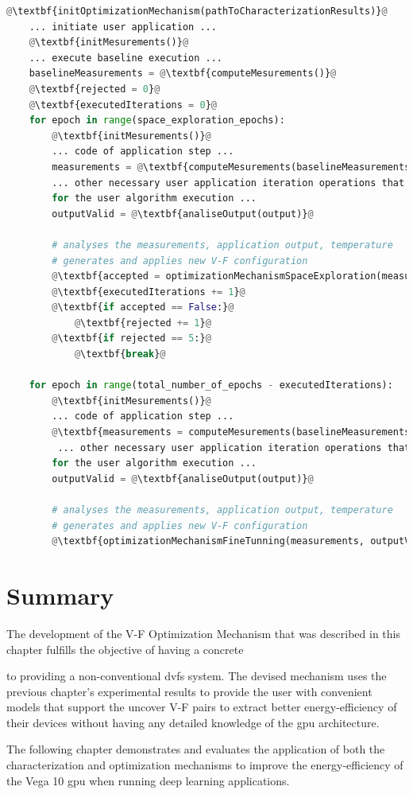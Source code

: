 \begin{lstlisting}[language=Python, caption=Example of usage of V-F Optimization Mechanism Library. Bold statements represents the added programming elements for the mechanism, label=lst:wrapper, basicstyle=\footnotesize\ttfamily,abovecaptionskip=0pt, captionpos=b,escapechar=@]
    @\textbf{initOptimizationMechanism(pathToCharacterizationResults)}@
    ... initiate user application ...
    @\textbf{initMesurements()}@
    ... execute baseline execution ...
    baselineMeasurements = @\textbf{computeMesurements()}@
    @\textbf{rejected = 0}@
    @\textbf{executedIterations = 0}@
    for epoch in range(space_exploration_epochs):
        @\textbf{initMesurements()}@
        ... code of application step ...
        measurements = @\textbf{computeMesurements(baselineMeasurements)}@
        ... other necessary user application iteration operations that do not account
        for the user algorithm execution ...
        outputValid = @\textbf{analiseOutput(output)}@
        
        # analyses the measurements, application output, temperature
        # generates and applies new V-F configuration
        @\textbf{accepted = optimizationMechanismSpaceExploration(measurements, outputValid)}@
        @\textbf{executedIterations += 1}@
        @\textbf{if accepted == False:}@
            @\textbf{rejected += 1}@
        @\textbf{if rejected == 5:}@
            @\textbf{break}@
    
    for epoch in range(total_number_of_epochs - executedIterations):
        @\textbf{initMesurements()}@
        ... code of application step ...
        @\textbf{measurements = computeMesurements(baselineMeasurements)}@
         ... other necessary user application iteration operations that do not account
        for the user algorithm execution ...
        outputValid = @\textbf{analiseOutput(output)}@
        
        # analyses the measurements, application output, temperature
        # generates and applies new V-F configuration
        @\textbf{optimizationMechanismFineTunning(measurements, outputValid)}@
\end{lstlisting}





\section{Summary}

The development of the V-F Optimization Mechanism that was described in this chapter fulfills the objective of having a concrete 

to providing a non-conventional \acrshort{dvfs} system. The devised mechanism uses the previous chapter's experimental results to provide the user with convenient models that support the uncover V-F pairs to extract better energy-efficiency of their devices without having any detailed knowledge of the \acrshort{gpu} architecture.

The following chapter demonstrates and evaluates the application of both the characterization and optimization mechanisms to improve the energy-efficiency of the Vega 10 \acrshort{gpu} when running deep learning applications.

